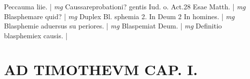 \documentclass{article}
\begin{document}
\begin{pages}
\footnotesize Peccauma liie. 
\normalsize| 
\hspace{0.2cm}\textit{mg}
\footnotesize Caussareprobationi? gentis Iud. o. Act.28 Esae Matth. 
\normalsize| 
\hspace{0.2cm}\textit{mg}
\footnotesize Blasphemare quid? 
\normalsize| 
\hspace{0.2cm}\textit{mg}
\footnotesize Duplex Bl. sphemia 2. In Deum 2 In homines. 
\normalsize| 
\hspace{0.2cm}\textit{mg}
\footnotesize Blasphemie aduersus su periores. 
\normalsize| 
\hspace{0.2cm}\textit{mg}
\footnotesize Blaspemiat Deum. 
\normalsize| 
\hspace{0.2cm}\textit{mg}
\footnotesize Definitio blasphemiex causis. 
\normalsize| 
\section*{AD TIMOTHEVM CAP. I. }

\end{pages}
\end{document}
